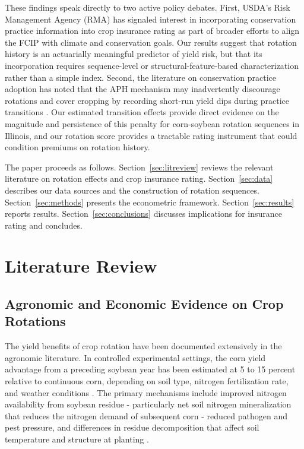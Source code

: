\documentclass[12pt,letterpaper]{article}
\theoremstyle{remark}
\theoremstyle{plain}
\theoremstyle{definition}
\begin{document}
These findings speak directly to two active policy debates. First, USDA's Risk Management Agency (RMA) has signaled interest in incorporating conservation practice information into crop insurance rating as part of broader efforts to align the FCIP with climate and conservation goals. Our results suggest that rotation history is an actuarially meaningful predictor of yield risk, but that its incorporation requires sequence-level or structural-feature-based characterization rather than a simple index. Second, the literature on conservation practice adoption has noted that the APH mechanism may inadvertently discourage rotations and cover cropping by recording short-run yield dips during practice transitions \citep{Connor2022}. Our estimated transition effects provide direct evidence on the magnitude and persistence of this penalty for corn-soybean rotation sequences in Illinois, and our rotation
score provides a tractable rating instrument that could condition premiums on rotation history.
 
The paper proceeds as follows. Section~\ref{sec:litreview} reviews the relevant literature on rotation effects and crop insurance rating. Section~\ref{sec:data} describes our data sources and the construction of rotation sequences. Section~\ref{sec:methods} presents the econometric framework. Section~\ref{sec:results} reports results. Section~\ref{sec:conclusions} discusses implications for insurance rating and concludes.

\section{\label{sec:litreview}Literature Review}
\subsection{\label{subsec:agronomy}Agronomic and Economic Evidence on Crop Rotations}

The yield benefits of crop rotation have been documented extensively in the agronomic literature. In controlled experimental settings, the corn yield advantage from a preceding soybean year has been estimated at 5 to 15 percent relative to continuous
corn, depending on soil type, nitrogen fertilization rate, and weather conditions \citep{Gentry2015, Farmaha2016}. The primary mechanisms include improved nitrogen availability from soybean residue - particularly net soil nitrogen mineralization that reduces the nitrogen demand of subsequent corn - reduced pathogen and pest pressure, and differences in residue decomposition that affect soil temperature and structure at planting \citep{Gentry2015}.
 
\end{document}
